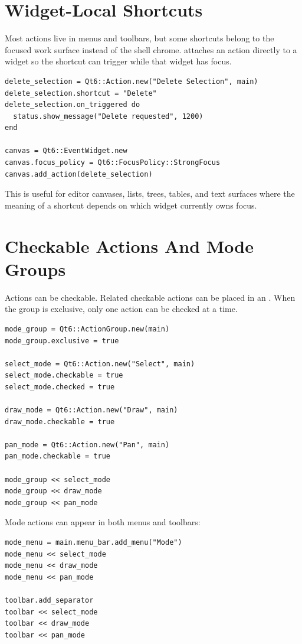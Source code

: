 \section{Widget-Local Shortcuts}

Most actions live in menus and toolbars, but some shortcuts belong to the focused work surface instead of the shell chrome.  attaches an action directly to a widget so the shortcut can trigger while that widget has focus.

\begin{lstlisting}[style=crystal]
delete_selection = Qt6::Action.new("Delete Selection", main)
delete_selection.shortcut = "Delete"
delete_selection.on_triggered do
  status.show_message("Delete requested", 1200)
end

canvas = Qt6::EventWidget.new
canvas.focus_policy = Qt6::FocusPolicy::StrongFocus
canvas.add_action(delete_selection)
\end{lstlisting}

This is useful for editor canvases, lists, trees, tables, and text surfaces where the meaning of a shortcut depends on which widget currently owns focus.

\section{Checkable Actions And Mode Groups}

Actions can be checkable. Related checkable actions can be placed in an . When the group is exclusive, only one action can be checked at a time.

\begin{lstlisting}[style=crystal]
mode_group = Qt6::ActionGroup.new(main)
mode_group.exclusive = true

select_mode = Qt6::Action.new("Select", main)
select_mode.checkable = true
select_mode.checked = true

draw_mode = Qt6::Action.new("Draw", main)
draw_mode.checkable = true

pan_mode = Qt6::Action.new("Pan", main)
pan_mode.checkable = true

mode_group << select_mode
mode_group << draw_mode
mode_group << pan_mode
\end{lstlisting}

Mode actions can appear in both menus and toolbars:

\begin{lstlisting}[style=crystal]
mode_menu = main.menu_bar.add_menu("Mode")
mode_menu << select_mode
mode_menu << draw_mode
mode_menu << pan_mode

toolbar.add_separator
toolbar << select_mode
toolbar << draw_mode
toolbar << pan_mode
\end{lstlisting}

